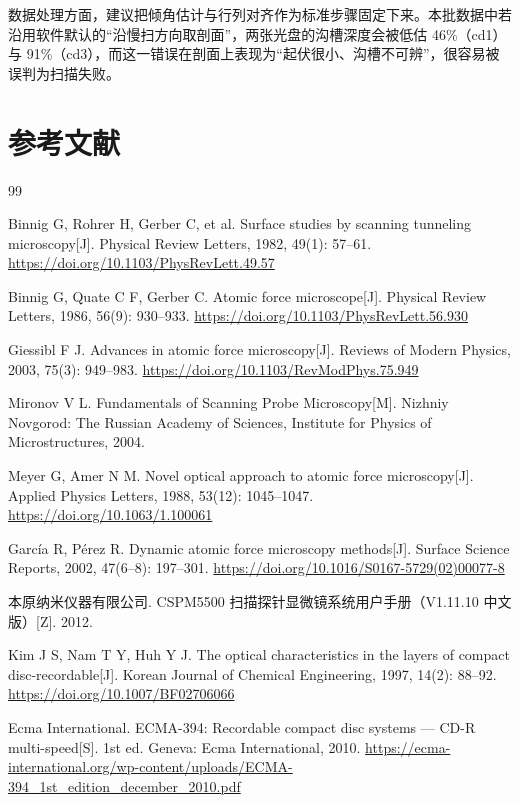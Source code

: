 \documentclass[12pt,a4paper,fontset=windows]{ctexart}
\begin{document}
数据处理方面，建议把倾角估计与行列对齐作为标准步骤固定下来。本批数据中若沿用软件默认的“沿慢扫方向取剖面”，两张光盘的沟槽深度会被低估 46\%（cd1）与 91\%（cd3），而这一错误在剖面上表现为“起伏很小、沟槽不可辨”，很容易被误判为扫描失败。

\newpage
\section{参考文献}
\renewcommand{\refname}{}
\songti{}
\begin{thebibliography}{99}

Binnig G, Rohrer H, Gerber C, et al. Surface studies by scanning tunneling microscopy[J]. Physical Review Letters, 1982, 49(1): 57--61.
\url{https://doi.org/10.1103/PhysRevLett.49.57}

Binnig G, Quate C F, Gerber C. Atomic force microscope[J]. Physical Review Letters, 1986, 56(9): 930--933.
\url{https://doi.org/10.1103/PhysRevLett.56.930}

Giessibl F J. Advances in atomic force microscopy[J]. Reviews of Modern Physics, 2003, 75(3): 949--983.
\url{https://doi.org/10.1103/RevModPhys.75.949}

Mironov V L. Fundamentals of Scanning Probe Microscopy[M]. Nizhniy Novgorod: The Russian Academy of Sciences, Institute for Physics of Microstructures, 2004.

Meyer G, Amer N M. Novel optical approach to atomic force microscopy[J]. Applied Physics Letters, 1988, 53(12): 1045--1047.
\url{https://doi.org/10.1063/1.100061}

García R, Pérez R. Dynamic atomic force microscopy methods[J]. Surface Science Reports, 2002, 47(6--8): 197--301.
\url{https://doi.org/10.1016/S0167-5729(02)00077-8}

本原纳米仪器有限公司. CSPM5500 扫描探针显微镜系统用户手册（V1.11.10 中文版）[Z]. 2012.

Kim J S, Nam T Y, Huh Y J. The optical characteristics in the layers of compact disc-recordable[J]. Korean Journal of Chemical Engineering, 1997, 14(2): 88--92.
\url{https://doi.org/10.1007/BF02706066}

Ecma International. ECMA-394: Recordable compact disc systems --- CD-R multi-speed[S]. 1st ed. Geneva: Ecma International, 2010.
\url{https://ecma-international.org/wp-content/uploads/ECMA-394_1st_edition_december_2010.pdf}


\end{thebibliography}
\end{document}
